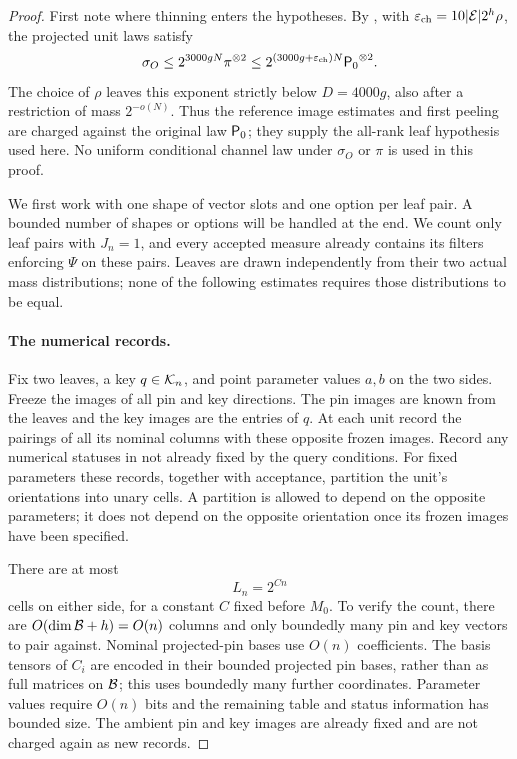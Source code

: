 \begin{proof}
First note where thinning enters the hypotheses.  By
, with
$\varepsilon_{\rm ch}=10|\mathcal E|2^h\rho$, the projected unit laws
satisfy
\[
 \sigma_O\le 2^{3000gN}\pi^{\otimes2}
 \le 2^{(3000g+\varepsilon_{\rm ch})N}
          {\mathsf P_0}^{\otimes2}.
\]
The choice of $\rho$ leaves this exponent strictly below
$D=4000g$, also after a restriction of mass $2^{-o(N)}$.
Thus the reference image estimates and first peeling are
charged against the original law ${\mathsf P_0}$; they supply the
all-rank leaf hypothesis used here.  No uniform conditional
channel law under $\sigma_O$ or $\pi$ is used in this proof.

We first work with one shape of vector slots and one option per
leaf pair.  A bounded number of shapes or options will be
handled at the end.  We count only leaf pairs with $J_n=1$,
and every accepted measure already contains its filters
enforcing $\Psi$ on these pairs.  Leaves are drawn independently
from their two actual mass distributions; none of the following
estimates requires those distributions to be equal.

\paragraph{The numerical records.}
Fix two leaves, a key $q\in\mathcal K_n$, and point parameter values
$a,b$ on the two sides.  Freeze the images of all pin and key
directions.  The pin images are known from the leaves and the
key images are the entries of $q$.  At each unit record the
pairings of all its nominal columns with these opposite frozen
images.  Record any numerical statuses in
 not already fixed
by the query conditions.  For fixed parameters these records,
together with acceptance, partition the unit's orientations
into unary cells.  A partition is allowed to depend on the
opposite parameters; it does not depend on the opposite
orientation once its frozen images have been specified.

There are at most
\begin{equation}\label{eq:record-count}
 L_n=2^{Cn}
\end{equation}
cells on either side, for a constant $C$ fixed before $M_0$.
To verify the count, there are $O(\dim\mathcal B+h)=O(n)$ columns
and only boundedly many pin and key vectors to pair against.
Nominal projected-pin bases use $O(n)$ coefficients.  The
basis tensors of $C_i$ are encoded in their bounded projected
pin bases, rather than as full matrices on $\mathcal B$; this uses
boundedly many further coordinates.  Parameter values require
$O(n)$ bits and the remaining table and status information has
bounded size.  The ambient pin and key images are already
fixed and are not charged again as new records.


\end{proof}
